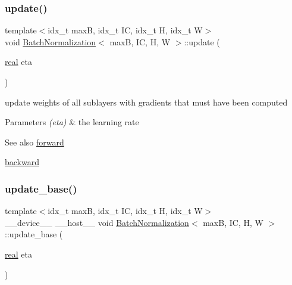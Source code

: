\subsubsection{\texorpdfstring{update()}{update()}}
{\footnotesize\ttfamily template$<$idx\+\_\+t maxB, idx\+\_\+t IC, idx\+\_\+t H, idx\+\_\+t W$>$ \\
void \hyperlink{structBatchNormalization}{Batch\+Normalization}$<$ maxB, IC, H, W $>$\+::update (\begin{DoxyParamCaption}\item[{\hyperlink{vgg__util_8h_a1082d08aaa761215ec83e7149f27ad16}{real}}]{eta }\end{DoxyParamCaption})\hspace{0.3cm}{\ttfamily [inline]}}



update weights of all sublayers with gradients that must have been computed 


\begin{DoxyParams}{Parameters}
{\em (eta)} & the learning rate \\
\hline
\end{DoxyParams}
\begin{DoxySeeAlso}{See also}
\hyperlink{structBatchNormalization_a315cda9d48dfa18a2f4f65ac7bb3b891}{forward} 

\hyperlink{structBatchNormalization_a3b6d987026effdc6c3a2c99e54ae58f9}{backward} 
\end{DoxySeeAlso}
\mbox{\label{structBatchNormalization_a757cb54212040fca8bc2465bbac26636}} 
\subsubsection{\texorpdfstring{update\+\_\+base()}{update\_base()}}
{\footnotesize\ttfamily template$<$idx\+\_\+t maxB, idx\+\_\+t IC, idx\+\_\+t H, idx\+\_\+t W$>$ \\
\+\_\+\+\_\+device\+\_\+\+\_\+ \+\_\+\+\_\+host\+\_\+\+\_\+ void \hyperlink{structBatchNormalization}{Batch\+Normalization}$<$ maxB, IC, H, W $>$\+::update\+\_\+base (\begin{DoxyParamCaption}\item[{\hyperlink{vgg__util_8h_a1082d08aaa761215ec83e7149f27ad16}{real}}]{eta }\end{DoxyParamCaption})\hspace{0.3cm}{\ttfamily [inline]}}



